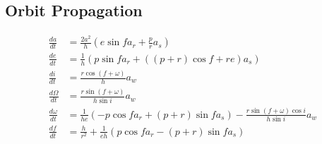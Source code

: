 \documentclass{article}
\begin{document}
\subsection{Orbit Propagation}

\begin{align*}
	\frac{da}{dt} &= \frac{2a^2}{h} \left( e\sin f a_r + \frac{p}{r} a_s \right) \\[10pt]
	\frac{de}{dt} &= \frac{1}{h} \left( p\sin f a_r + \left( (p + r) \cos f + re \right) a_s \right) \\[10pt]
	\frac{di}{dt} &= \frac{r\cos (f + \omega)}{h} a_w \\[10pt]
	\frac{d\Omega}{dt} &= \frac{r\sin (f + \omega)}{h\sin i} a_w \\[10pt]
	\frac{d\omega}{dt} &= \frac{1}{he} \left( -p\cos f a_r + (p + r)\sin f a_s \right) - \frac{r\sin(f + \omega) \cos i}{h\sin i} a_w \\[10pt]
	\frac{df}{dt} &= \frac{h}{r^2} + \frac{1}{eh} \left( p\cos f a_r - (p + r)\sin f a_s \right)
\end{align*}


 





	

	
\end{document}
